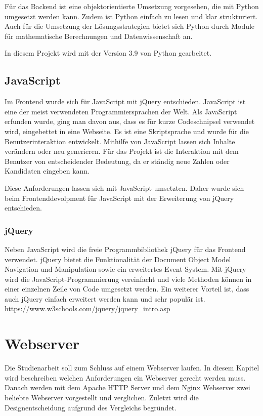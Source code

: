 Für das Backend ist eine objektorientierte Umsetzung vorgesehen, die mit Python umgesetzt werden kann. Zudem ist Python einfach zu lesen und klar strukturiert. Auch für die Umsetzung der Lösungsstrategien bietet sich Python durch Module für mathematische Berechnungen und Datenwissenschaft an. 

In diesem Projekt wird mit der Version 3.9 von Python gearbeitet. \cite{Python} \cite{DataToolkit}

\subsection{JavaScript}
Im Frontend wurde sich für JavaScript mit jQuery entschieden. JavaScript ist eine der meist verwendeten Programmiersprachen der Welt. Als JavaScript erfunden wurde, ging man davon aus, dass es für kurze Codeschnipsel verwendet wird, eingebettet in eine Webseite. Es ist eine Skriptsprache und wurde für die Benutzerinteraktion entwickelt. Mithilfe von JavaScript lassen sich Inhalte verändern oder neu generieren. Für das Projekt ist die Interaktion mit dem Benutzer von entscheidender Bedeutung, da er ständig neue Zahlen oder Kandidaten eingeben kann. 

Diese Anforderungen lassen sich mit JavaScript umsetzten. Daher wurde sich beim Frontenddevolpment für JavaScript mit der Erweiterung von jQuery entschieden. 


\subsubsection{jQuery}
Neben JavaScript wird die freie Programmbibliothek jQuery für das Frontend verwendet. jQuery bietet die Funktionalität der Document Object Model Navigation und Manipulation sowie ein erweitertes Event-System. Mit jQuery wird die JavaScript-Programmierung vereinfacht und viele Methoden können in einer einzelnen Zeile von Code umgesetzt werden. Ein weiterer Vorteil ist, dass auch jQuery einfach erweitert werden kann und sehr populär ist. https://www.w3schools.com/jquery/jquery\_intro.asp


\section{Webserver}
Die Studienarbeit soll zum Schluss auf einem Webserver laufen. In diesem Kapitel wird beschreiben welchen Anforderungen ein Webserver gerecht werden muss. Danach werden mit dem Apache HTTP Server und dem Nginx Webserver zwei beliebte Webserver vorgestellt und verglichen. Zuletzt wird die Designentscheidung aufgrund des Vergleichs begründet.

